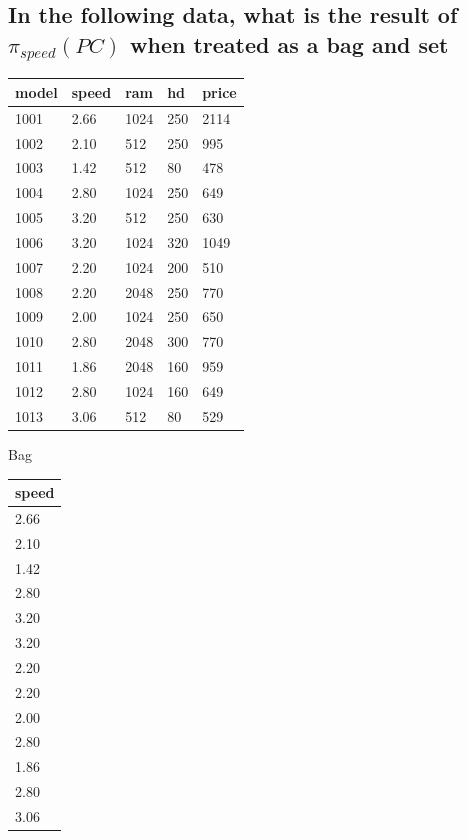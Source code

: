 \documentclass[12pt, a4paper]{article}
\begin{document}
			\subsection{In the following data, what is the result of $\pi_{speed}(PC)$ when treated as a bag and set}
				\begin{table}[h!]
				\begin{tabular}{|l|l|l|l|l|}
				\hline
				model & speed &ram &hd &price  \\\hline
				1001 &2.66 &1024 &250 &2114 \\\hline
				1002 &2.10 & 512 &250 &995   \\\hline
				1003 &1.42 & 512 & 80 &478      \\\hline
				1004 &2.80 &1024 &250 &649    \\\hline
				1005 &3.20 &512 &250 &630     \\\hline
				1006 &3.20 &1024 &320 &1049   \\\hline
				1007 &2.20 & 1024 &200 &510  \\\hline
				1008 &2.20 &2048 &250 &770  \\\hline
				1009 &2.00 &1024 &250 &650  \\\hline
				1010 &2.80 &2048 &300 &770    \\\hline
				1011 &1.86 &2048 &160 &959  \\\hline
				1012 &2.80 &1024 &160 &649    \\\hline
				1013 &3.06 &512 &80 &529     \\\hline
				\end{tabular}
				\end{table}
				\begin{minipage}[t]{0.5\textwidth}
				\begin{center}
				Bag\\
				\begin{tabular}{|l|}
				\hline
				speed\\\hline
				2.66 \\\hline
				2.10 \\\hline
				1.42 \\\hline
				2.80 \\\hline
				3.20 \\\hline
				3.20 \\\hline
				2.20 \\\hline
				2.20 \\\hline
				2.00 \\\hline
				2.80 \\\hline
				1.86 \\\hline
				2.80 \\\hline
				3.06 \\\hline
				\end{tabular}
				\end{center}
				\end{minipage}
\end{document}

